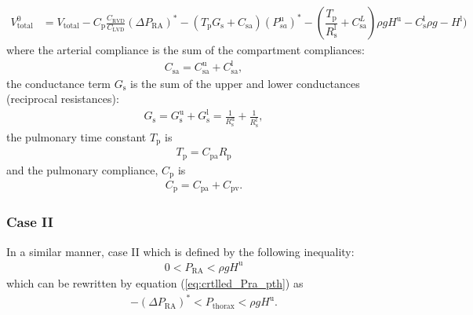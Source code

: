 \documentclass[12pt]{article}
\begin{document}
\begin{align}
V_{\text{total}}^0 &= V_\text{total}- C_\text{p} \frac{C_\text{RVD}}{C_\text{LVD}}\left (\Delta P_{\text{RA}}\right)^* -\left(T_\text{p} G_\text{s}+C_\text{sa}\right)\left(P_{sa}^\text{u}\right)^* - \left(\dfrac{T_\text{p} }{R_\text{s}^\text{l}} +C_\text{sa}^L\right) \rho g H^\text{u} -C_\text{s}^\text{l} \rho g-H^\text{l}) \label{eq:solution_VTO_caseI}
\end{align}
where the arterial compliance is the sum of the compartment compliances: 
\begin{align}
    C_\text{sa} =C_\text{sa}^{\text{u}}+C_\text{sa}^{\text{l}},
\end{align} 
the conductance term $G_{\text{s}}$ is the sum of the upper and lower conductances (reciprocal resistances):
\begin{align}
G_\text{s} = G_\text{s}^\text{u} + G_\text{s}^\text{l} = \frac{1}{R_\text{s}^\text{u}}+\frac{1}{R_\text{s}^\text{l}},
\end{align}
the pulmonary time constant $T_\text{p}$ is 
\begin{align}
    T_\text{p} = C_\text{pa}R_\text{p}
\end{align}
 and the pulmonary compliance, $C_\text{p}$ is
 \begin{align}
     C_\text{p}=C_\text{pa}+C_\text{pv}.
 \end{align}
 

\subsubsection{Case II}
In a similar manner, case II which is defined by the following inequality: 
\begin{align}
    0 < P_\text{RA} < \rho g H^\text{u} 
\end{align}
which can be rewritten by equation (\ref{eq:crtlled_Pra_pth}) as
\begin{align}
    -\left( \Delta P_{\text{RA}} \right)^*<P_\text{thorax}<\rho g H^\text{u}.
\end{align}
\end{document}
